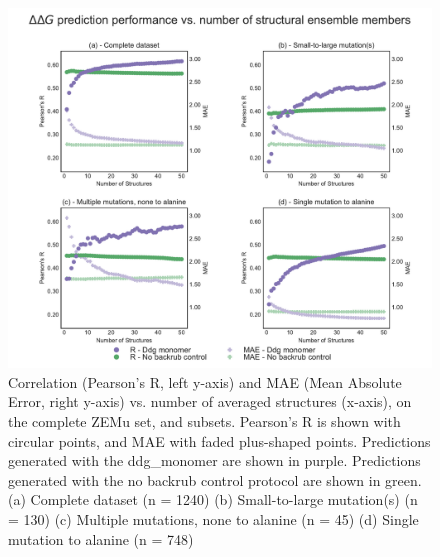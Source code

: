 \begin{figure}
  \includegraphics[width=\textwidth,keepaspectratio]{structs-v-corr-WildTypeComplex-ddg-monomer-16-003-zemu-2.pdf}
  \caption[]{ %
    Correlation (Pearson's R, left y-axis) and MAE (Mean Absolute Error, right y-axis) vs. number of averaged structures (x-axis), on the complete ZEMu set, and subsets.
    Pearson's R is shown with circular points, and MAE with faded plus-shaped points.
    Predictions generated with the ddg\_monomer are shown in purple.
    Predictions generated with the no backrub control protocol are shown in green.
    (a) Complete dataset (n = 1240)
    (b) Small-to-large mutation(s) (n = 130)
    (c) Multiple mutations, none to alanine (n = 45)
    (d) Single mutation to alanine (n = 748)
  } \label{fig:structs-v-corr-WildTypeComplex-ddg-monomer-16-003-zemu-2}
\end{figure}
